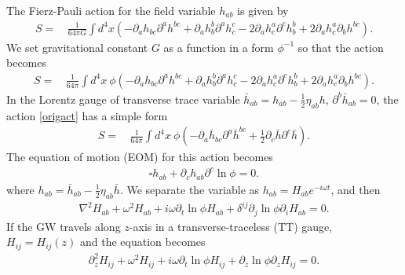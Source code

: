 \documentclass[
    jor,
    amsmath,amssymb,preprint,
    superscriptaddress,
]{revtex4-2}
\begin{document}
The Fierz-Pauli action for the field variable $h_{ab}$ is given by~\cite{roy2020probing}
\begin{equation}
\begin{aligned}
S = & \,\frac{1}{64 \pi G} \int d^4 x\left(-\partial_a h_{b c} \partial^a h^{b c}+\partial_a h_b^b \partial^a h_c^c-2 \partial_a h_c^a \partial^c h_b^b+2 \partial_a h_c^a \partial_b h^{b c}\right).
\end{aligned}
\end{equation}
We set gravitational constant $G$ as a function in a form $\phi^{-1}$ so that the action becomes
\begin{equation}
\begin{aligned}
S = & \,\frac{1}{64 \pi} \int d^4 x~\phi\left(-\partial_a h_{b c} \partial^a h^{b c}+\partial_a h_b^b \partial^a h_c^c-2 \partial_a h_c^a \partial^c h_b^b+2 \partial_a h_c^a \partial_b h^{b c}\right). \label{origact}
\end{aligned}
\end{equation}
In the Lorentz gauge of transverse trace variable $\bar{h}_{ab} = h_{ab} - \frac{1}{2}\eta_{ab}h$, $\partial^b \bar{h}_{ab} = 0$, the action \eqref{origact} has a simple form
\begin{equation}
\begin{aligned}
S = & \,\frac{1}{64 \pi} \int d^4 x~\phi \left( -\partial_a\bar{h}_{bc}\partial^a\bar{h}^{bc} + \frac{1}{2}\partial_c\bar{h}\partial^c\bar{h} \right).
\end{aligned}
\end{equation}
The equation of motion (EOM) for this action becomes
\begin{align}
\square h_{ab} + \partial_ch_{ab}\partial^c\ln\phi = 0. \label{fereom}
\end{align}
where $h_{ab} = \bar{h}_{ab} - \frac{1}{2} \eta_{ab}\bar{h}$. We separate the variable as $h_{ab} = H_{ab}e^{-i\omega t}$, and then
\begin{equation}
\begin{aligned}
\nabla^2 H_{ab} + \omega^2 H_{ab} + i\omega \partial_t\ln \phi H_{ab} + \delta^{ij} \partial_j\ln \phi \partial_iH_{ab} = 0.
\end{aligned}
\end{equation}
If the GW travels along $z$-axis in a transverse-traceless (TT) gauge, $H_{ij} = H_{ij}(z)$ and the equation becomes
\begin{align}
\partial_z^2 H_{ij} + \omega^2 H_{ij} + i\omega \partial_t\ln \phi H_{ij} + \partial_z\ln \phi \partial_zH_{ij} = 0. \label{ferorg}
\end{align}
\end{document}
